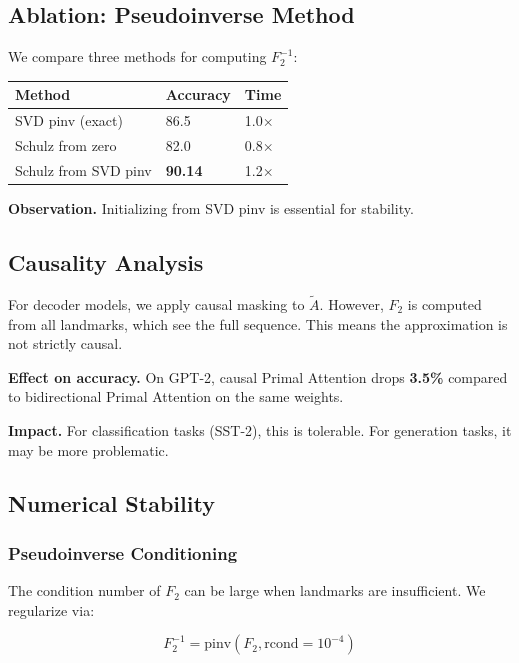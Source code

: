 \subsection{Ablation: Pseudoinverse Method}

We compare three methods for computing $F_2^{-1}$:

\begin{table}[H]
\centering
\small
\begin{tabular}{lll}
\toprule
\textbf{Method} & \textbf{Accuracy} & \textbf{Time} \\
\midrule
SVD pinv (exact) & 86.5 & 1.0$\times$ \\
Schulz from zero & 82.0 & 0.8$\times$ \\
Schulz from SVD pinv & \textbf{90.14} & 1.2$\times$ \\
\bottomrule
\end{tabular}
\end{table}

\textbf{Observation.} Initializing from SVD pinv is essential for stability.

\subsection{Causality Analysis}

For decoder models, we apply causal masking to $\tilde{A}$. However, 
$F_2$ is computed from all landmarks, which see the full sequence. This 
means the approximation is not strictly causal.

\textbf{Effect on accuracy.} On GPT-2, causal Primal Attention drops 
\textbf{3.5\%} compared to bidirectional Primal Attention on the 
same weights.

\textbf{Impact.} For classification tasks (SST-2), this is tolerable. For 
generation tasks, it may be more problematic.

\subsection{Numerical Stability}

\subsubsection{Pseudoinverse Conditioning}

The condition number of $F_2$ can be large when landmarks are 
insufficient. We regularize via:

\[
F_2^{-1} = \text{pinv}(F_2, \text{rcond}=10^{-4})
\]

